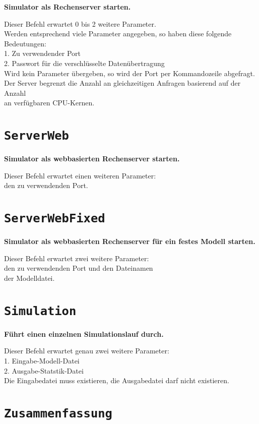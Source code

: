 \textbf{Simulator als Rechenserver starten.}

Dieser Befehl erwartet 0 bis 2 weitere Parameter.\\
Werden entsprechend viele Parameter angegeben, so haben diese folgende Bedeutungen:\\
1. Zu verwendender Port\\
2. Passwort für die verschlüsselte Datenübertragung\\
Wird kein Parameter übergeben, so wird der Port per Kommandozeile abgefragt.\\
Der Server begrenzt die Anzahl an gleichzeitigen Anfragen basierend auf der Anzahl\\
an verfügbaren CPU-Kernen.

\section{\texttt{ServerWeb}}

\textbf{Simulator als webbasierten Rechenserver starten.}

Dieser Befehl erwartet einen weiteren Parameter:\\
den zu verwendenden Port.

\section{\texttt{ServerWebFixed}}

\textbf{Simulator als webbasierten Rechenserver für ein festes Modell starten.}

Dieser Befehl erwartet zwei weitere Parameter:\\
den zu verwendenden Port und den Dateinamen\\
der Modelldatei.

\section{\texttt{Simulation}}

\textbf{Führt einen einzelnen Simulationslauf durch.}

Dieser Befehl erwartet genau zwei weitere Parameter:\\
1. Eingabe-Modell-Datei\\
2. Ausgabe-Statstik-Datei\\
Die Eingabedatei muss existieren, die Ausgabedatei darf nicht existieren.

\section{\texttt{Zusammenfassung}}

